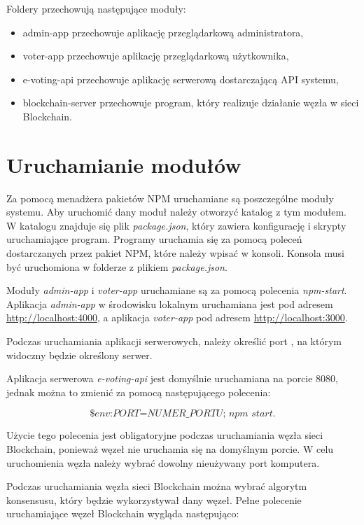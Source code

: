 \documentclass[a4paper,12pt]{book}
\begin{document}
Foldery przechowują następujące moduły:
\begin{itemize}
	\item admin-app przechowuje aplikację przeglądarkową administratora,
	\item voter-app przechowuje aplikację przeglądarkową użytkownika,
	\item e-voting-api przechowuje aplikację serwerową dostarczającą API systemu,
	\item blockchain-server przechowuje program, który realizuje działanie węzła w sieci Blockchain.
\end{itemize}

\section{Uruchamianie modułów}

Za pomocą menadżera pakietów NPM uruchamiane są poszczególne moduły systemu. Aby uruchomić dany moduł należy otworzyć katalog z tym modułem. W katalogu znajduje się plik \textit{package.json}, który zawiera konfigurację i skrypty uruchamiające program. Programy uruchamia się za pomocą poleceń dostarczanych przez pakiet NPM, które należy wpisać w konsoli. Konsola musi być uruchomiona w folderze z plikiem \textit{package.json}.

Moduły \textit{admin-app} i \textit{voter-app} uruchamiane są za pomocą polecenia \textit{npm-start}. Aplikacja \textit{admin-app} w środowisku lokalnym uruchamiana jest pod adresem \url{http://localhost:4000}, a aplikacja \textit{voter-app} pod adresem \url{http://localhost:3000}.

Podczas uruchamiania aplikacji serwerowych, należy określić port , na którym widoczny będzie określony serwer.

Aplikacja serwerowa \textit{e-voting-api} jest domyślnie uruchamiana na porcie 8080, jednak można to zmienić za pomocą następującego polecenia:

\begin{equation}
	\textit{\$env:PORT=NUMER\_PORTU; npm start}.
\end{equation}

Użycie tego polecenia jest obligatoryjne podczas uruchamiania węzła sieci Blockchain, ponieważ węzeł nie uruchamia się na domyślnym porcie. W celu uruchomienia węzła należy wybrać dowolny nieużywany port komputera.
 
Podczas uruchamiania węzła sieci Blockchain można wybrać algorytm konsensusu, który będzie wykorzystywał dany węzeł. Pełne polecenie uruchamiające węzeł Blockchain wygląda następująco:
\end{document}
